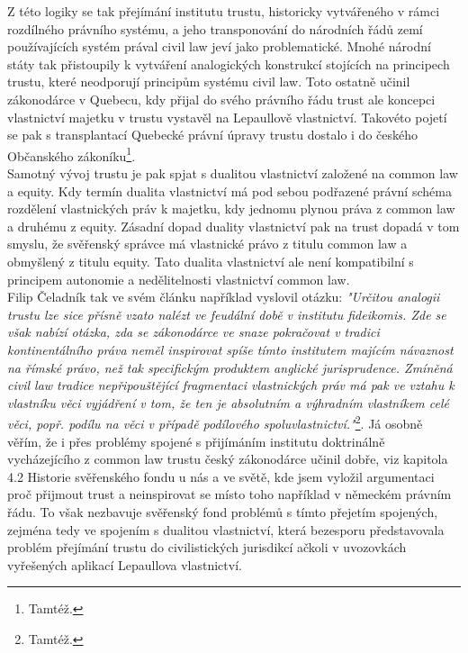 \documentclass{article}
\begin{document}
Z této logiky se tak přejímání institutu trustu, historicky vytvářeného v rámci rozdílného právního systému, a jeho transponování do národních řádů zemí používajících systém prával civil law jeví jako problematické. Mnohé národní státy tak přistoupily k vytváření analogických konstrukcí stojících na principech trustu, které neodporují principům systému civil law. Toto ostatně učinil zákonodárce v Quebecu, kdy přijal do svého právního řádu trust ale koncepci vlastnictví majetku v trustu vystavěl na Lepaullově vlastnictví. Takovéto pojetí se pak s transplantací Quebecké právní úpravy trustu dostalo i do českého Občanského zákoníku\footnote{Tamtéž.}.\\

Samotný vývoj trustu je pak spjat s dualitou vlastnictví založené na common law a equity. Kdy termín dualita vlastnictví má pod sebou podřazené právní schéma rozdělení vlastnických práv k majetku, kdy jednomu plynou práva z common law a druhému z equity. Zásadní dopad duality vlastnictví pak na trust dopadá v tom smyslu, že svěřenský správce má vlastnické právo z titulu common law a obmyšlený z titulu equity. Tato dualita vlastnictví ale není kompatibilní s principem autonomie a nedělitelnosti vlastnictví common law. \\

Filip Čeladník tak ve svém článku například vyslovil otázku: \textit{"Určitou analogii trustu lze sice přísně vzato nalézt ve feudální době v institutu fideikomis. Zde se však nabízí otázka, zda se zákonodárce ve snaze pokračovat v tradici kontinentálního práva neměl inspirovat spíše tímto institutem majícím návaznost na římské právo, než tak specifickým produktem anglické jurisprudence. Zmíněná civil law tradice nepřipouštějící fragmentaci vlastnických práv má pak ve vztahu k vlastníku věci vyjádření v tom, že ten je absolutním a výhradním vlastníkem celé věci, popř. podílu na věci v případě podílového spoluvlastnictví."}\footnote{Tamtéž.}. Já osobně věřím, že i přes problémy spojené s přijímáním institutu doktrinálně vycházejícího z common law trustu český zákonodárce učinil dobře, viz kapitola 4.2 Historie svěřenského fondu u nás a ve světě, kde jsem vyložil argumentaci proč přijmout trust a neinspirovat se místo toho například v německém právním řádu. To však nezbavuje svěřenský fond problémů s tímto přejetím spojených, zejména tedy ve spojením s dualitou vlastnictví, která bezesporu představovala problém přejímání trustu do civilistických jurisdikcí ačkoli v uvozovkách vyřešených aplikací Lepaullova vlastnictví.\\
\end{document}
